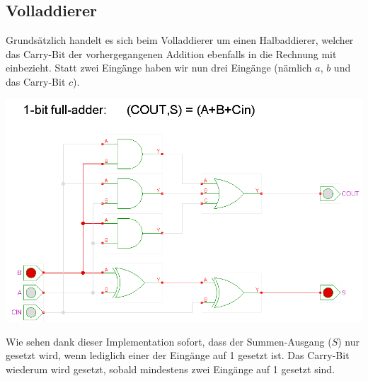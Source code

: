 \documentclass{report}
\begin{document}
\subsection{Volladdierer}
Grundsätzlich handelt es sich beim Volladdierer um einen Halbaddierer, welcher das Carry-Bit der vorhergegangenen Addition ebenfalls in die Rechnung mit einbezieht. Statt zwei Eingänge haben wir nun drei Eingänge (nämlich $a$, $b$ und das Carry-Bit $c$).
\begin{center}\includegraphics[scale=0.3]{img/full-adder.png}\end{center}
Wie sehen dank dieser Implementation sofort, dass der Summen-Ausgang ($S$) nur gesetzt wird, wenn lediglich einer der Eingänge auf 1 gesetzt ist. Das Carry-Bit wiederum wird gesetzt, sobald mindestens zwei Eingänge auf 1 gesetzt sind.
\end{document}
